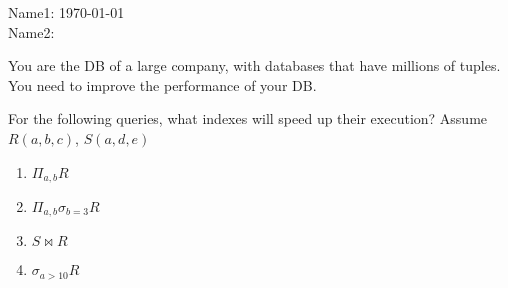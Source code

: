 \documentclass[11pt]{article}
\begin{document}
\huge

\noindent Name1: \hfill \today \\
\noindent Name2:
\vspace{1cm}

You are the DB of a large company, with databases that have millions
of tuples. You need to improve the performance of your DB. 

For the following queries, what indexes will speed up their execution?
Assume $R(a,b,c)$, $S(a, d, e)$

\begin{enumerate}
\item $\Pi_{a,b} R$
\vspace{2cm}
\item $\Pi_{a,b} \sigma_{b = 3}R$
\vspace{2cm}
\item $S \bowtie R$
\vspace{2cm}
\item $\sigma_{a > 10}R$
\end{enumerate}
\end{document}
